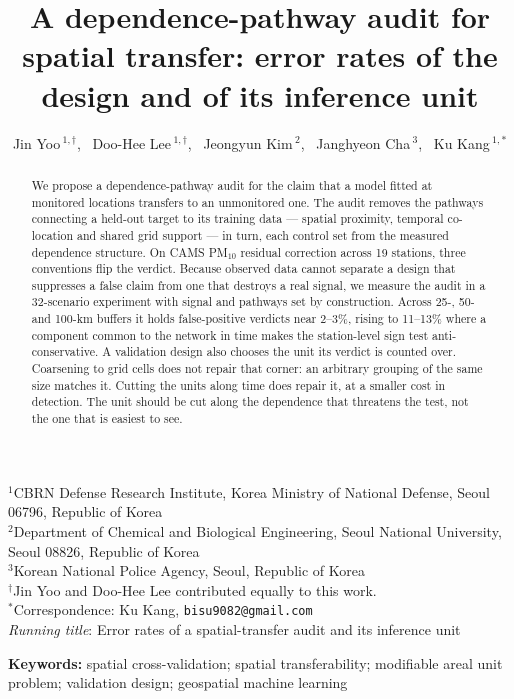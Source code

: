 \documentclass[12pt]{article}
\newcommand{\pmten}{PM$_{10}$}
\begin{document}
\doublespacing
\title{\bf A dependence-pathway audit for spatial transfer: error rates of the
design and of its inference unit}
\author{Jin Yoo\,$^{1,\dagger}$, \ Doo-Hee Lee\,$^{1,\dagger}$, \ Jeongyun Kim\,$^{2}$,
\ Janghyeon Cha\,$^{3}$, \ Ku Kang\,$^{1,*}$}
\date{}
\maketitle
\thispagestyle{empty}
\begin{center}\small\singlespacing
$^{1}$CBRN Defense Research Institute, Korea Ministry of National Defense, Seoul 06796, Republic of Korea\\
$^{2}$Department of Chemical and Biological Engineering, Seoul National University, Seoul 08826, Republic of Korea\\
$^{3}$Korean National Police Agency, Seoul, Republic of Korea\\[2pt]
$^{\dagger}$Jin Yoo and Doo-Hee Lee contributed equally to this work.\\
$^{*}$Correspondence: Ku Kang, \texttt{bisu9082@gmail.com}
\\[4pt]
\emph{Running title}: Error rates of a spatial-transfer audit and its inference unit
\end{center}
\begin{abstract}
We propose a dependence-pathway audit for the claim that a model fitted at monitored locations transfers to an unmonitored one. The audit removes the pathways connecting a held-out target to its training data --- spatial proximity, temporal co-location and shared grid support --- in turn, each control set from the measured dependence structure. On CAMS \pmten{} residual correction across 19 stations, three conventions flip the verdict. Because observed data cannot separate a design that suppresses a false claim from one that destroys a real signal, we measure the audit in a 32-scenario experiment with signal and pathways set by construction. Across 25-, 50- and 100-km buffers it holds false-positive verdicts near 2--3\%, rising to 11--13\% where a component common to the network in time makes the station-level sign test anti-conservative. A validation design also chooses the unit its verdict is counted over. Coarsening to grid cells does not repair that corner: an arbitrary grouping of the same size matches it. Cutting the units along time does repair it, at a smaller cost in detection. The unit should be cut along the dependence that threatens the test, not the one that is easiest to see.
\end{abstract}
\par\medskip\noindent\textbf{Keywords:} spatial cross-validation; spatial transferability; modifiable areal unit problem; validation design; geospatial machine learning
\clearpage

\end{document}
